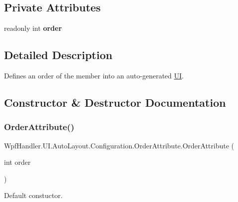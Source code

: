 \subsection*{Private Attributes}
\begin{DoxyCompactItemize}
\item 
\mbox{\label{class_wpf_handler_1_1_u_i_1_1_auto_layout_1_1_configuration_1_1_order_attribute_a3a9164418c248a5bd362cf40f69f5a9c}} 
readonly int {\bfseries order}
\end{DoxyCompactItemize}


\subsection{Detailed Description}
Defines an order of the member into an auto-\/generated \mbox{\hyperlink{namespace_wpf_handler_1_1_u_i}{UI}}. 



\subsection{Constructor \& Destructor Documentation}
\mbox{\label{class_wpf_handler_1_1_u_i_1_1_auto_layout_1_1_configuration_1_1_order_attribute_a1cd880e2369a3a6be08d0ace9be115ab}} 
\subsubsection{\texorpdfstring{Order\+Attribute()}{OrderAttribute()}}
{\footnotesize\ttfamily Wpf\+Handler.\+U\+I.\+Auto\+Layout.\+Configuration.\+Order\+Attribute.\+Order\+Attribute (\begin{DoxyParamCaption}\item[{int}]{order }\end{DoxyParamCaption})}



Default constuctor. 


